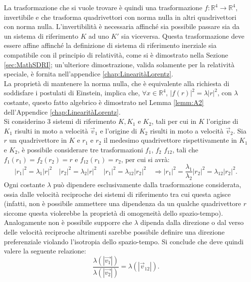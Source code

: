 La trasformazione che si vuole trovare è quindi una trasformazione $f:\mathbb{R}^4\rightarrow\mathbb{R}^4$, invertibile e che trasforma quadrivettori con norma nulla in altri quadrivettori con norma nulla. L'invertibilità è necessaria affinché sia possibile passare sia da un sistema di riferimento $K$ ad uno $K'$ sia viceversa. Questa trasformazione deve essere affine affinché la definizione di sistema di riferimento inerziale sia compatibile con il principio di relatività, come si è dimostrato nella Sezione \ref{sec:MathSDRI}; un'ulteriore dimostrazione, valida solamente per la relatività speciale, è fornita nell'appendice \ref{chap:LinearitàLorentz}.\\
La proprietà di mantenere la norma nulla, che è equivalente alla richiesta di soddisfare i postulati di Einstein, implica che, $\forall x\in\mathbb{R}^4$, $|f(r)|^2=\lambda |r|^2$, con $\lambda$ costante, questo fatto algebrico è dimostrato nel Lemma \ref{lemm:A2} dell'Appendice \ref{chap:LinearitàLorentz}.\\ Si considerino $3$ sistemi di riferimento $ K, K_1$ e $K_2$, tali per cui in $K$ l'origine di $K_1$ risulti in moto a velocità $\vec{v}_1$ e l'origine di $K_2$ risulti in moto a velocità $\vec{v}_2$. Sia $r$ un quadrivettore in $K$ e $r_1$ e $r_2$ il medesimo quadrivettore rispettivamente in $K_1$ e $K_2$, è possibile considerare tre trasformazioni $f_1$, $f_2$ $f_{12}$, tali che $f_1(r_1)=f_2(r_2)=r$ e $f_{12}(r_1)=r_2$, per cui si avrà:
\begin{equation*}
    |r_1|^2=\lambda_1 |r|^2 \quad |r_2|^2=\lambda_2 |r|^2 \quad |r_1|^2=\lambda_{12} |r_2|^2 \quad  \Rightarrow |r_1|^2=\frac{\lambda_1}{\lambda_2}|r_2|^2=\lambda_{12}|r_2|^2.
\end{equation*}
Ogni costante $\lambda$ può dipendere esclusivamente dalla trasformazione considerata, ossia dalle velocità reciproche dei sistemi di riferimento tra cui questa agisce (infatti, non è possibile ammettere una dipendenza da un qualche quadrivettore $r$ siccome questa violerebbe la proprietà di omogeneità dello spazio-tempo). Analogamente non è possibile supporre che $\lambda$ dipenda dalla direzione o dal verso delle velocità reciproche altrimenti sarebbe possibile definire una direzione preferenziale violando l'isotropia dello spazio-tempo. Si conclude che deve quindi valere la seguente relazione:
\begin{equation}
    \frac{\lambda(|\vec{v_1}|)}{\lambda(|\vec{v_2}|)}=\lambda(|\vec{v}_{12}|).
    \label{fraclambda}
\end{equation} 
